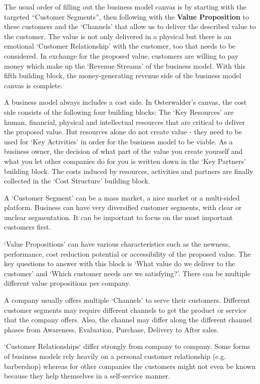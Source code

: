 		The usual order of filling out the business model canvas \cite{bmc} is by starting with the targeted ``Customer Segments'', then following with the \textbf{Value Proposition} to these customers and the `Channels' that allow us to deliver the described value to the customer. The value is not only delivered in a physical but there is an emotional `Customer Relationship' with the customer, too that needs to be considered. In exchange for the proposed value, customers are willing to pay money which make up the `Revenue Streams' of the business model. With this fifth building block, the money-generating revenue side of the business model canvas is complete.

		A business model always includes a cost side. In Osterwalder's canvas, the cost side consists of the following four building blocks: The `Key Resources' are human, financial, physical and intellectual resources that are critical to deliver the proposed value. But resources alone do not create value - they need to be used for `Key Activities' in order for the business model to be viable. As a business owner, the decision of what part of the value you create yourself and what you let other companies do for you is written down in the `Key Partners' building block. The costs induced by resources, activities and partners are finally collected in the `Cost Structure' building block.

		A `Customer Segment' can be a mass market, a nice market or a multi-sided platform. Business can have very diversified customer segments, with clear or unclear segmentation. It can be important to focus on the most important customers first.

		`Value Propositions' can have various characteristics such as the newness, performance, cost reduction potential or accessibility of the proposed value. The key questions to answer with this block is `What value do we deliver to the customer' and `Which customer needs are we satisfying?'. There can be multiple different value propositions per company.

		A company usually offers multiple `Channels' to serve their customers. Different customer segments may require different channels to get the product or service that the company offers. Also, the channel may differ along the different channel phases from Awareness, Evaluation, Purchase, Delivery to After sales.

		`Customer Relationships` differ strongly from company to company. Some forms of business models rely heavily on a personal customer relationship (e.g. barbershop) whereas for other companies the customers might not even be known because they help themselves in a self-service manner.


